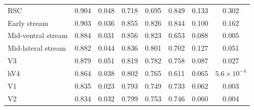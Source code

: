 \documentclass[11pt,a4paper]{article}
\begin{document}
\begin{table}[tb]
\begin{tabular}{lccccccc}
RSC                 & \num{0.904} & \num{0.048} & \num{0.718} & \num{0.695} & \num{0.849} & \num{0.133} & 0.302 \\
Early stream        & \num{0.903} & \num{0.036} & \num{0.855} & \num{0.826} & \num{0.844} & \num{0.100} & 0.162 \\
Mid-ventral stream  & \num{0.884} & \num{0.031} & \num{0.856} & \num{0.823} & \num{0.653} & \num{0.088} & 0.005 \\
Mid-lateral stream  & \num{0.882} & \num{0.044} & \num{0.836} & \num{0.801} & \num{0.702} & \num{0.127} & 0.051 \\
V3                  & \num{0.879} & \num{0.051} & \num{0.819} & \num{0.782} & \num{0.758} & \num{0.087} & 0.027 \\
hV4                 & \num{0.864} & \num{0.038} & \num{0.802} & \num{0.765} & \num{0.611} & \num{0.065} & $5.6\times10^{-4}$ \\
V1                  & \num{0.835} & \num{0.023} & \num{0.793} & \num{0.749} & \num{0.733} & \num{0.062} & 0.003 \\
V2                  & \num{0.834} & \num{0.032} & \num{0.799} & \num{0.753} & \num{0.746} & \num{0.060} & 0.004 \\
\bottomrule
\end{tabular}
\end{table}
\end{document}
